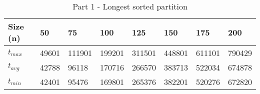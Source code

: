 \usepackage{array}
\usepackage{tabu}
\usepackage{siunitx}
\usepackage{booktabs}%

\begin{table}[h!]
\fontsize{8}{11}\selectfont
\begin{center}
\begin{tabu} to 0.5\textwidth {|X[c]|X[c]|X[c]|X[c]|X[c]|X[c]|X[c]|X[c]|} 
 \hline
 Size (n) & 50 & 75 & 100 & 125 & 150 & 175 & 200 \\
 \hline\hline
 $t_{max}$ & 49601 & 111901 & 199201 & 311501 & 448801 & 611101 & 790429 \\
 \hline
 $t_{avg}$ & 42788 & 96118 & 170716 & 266570 & 383713 & 522034 & 674878 \\
 \hline
 $t_{min}$ & 42401 & 95476 & 169801 & 265376 & 382201 & 520276 & 672820 \\
 \hline
\end{tabu}
\label{partition_table}
\caption{Part 1 - Longest sorted partition}
\end{center}
\end{table}
